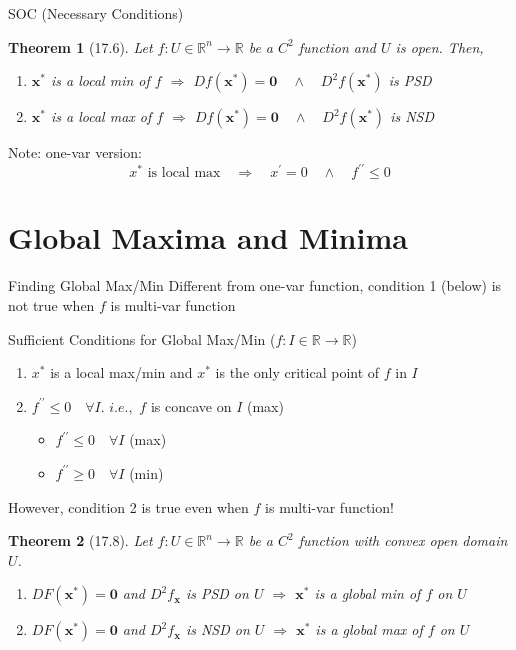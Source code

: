 \documentclass[final]{beamer}
\newtheorem{thm}{Theorem}
\newcommand{\bb}{\mathbb}
\newcommand{\bd}{\mathbf}
\begin{document}
\begin{frame}[t]{SOC (Necessary Conditions)}
	\begin{thm}
		[17.6] Let $f:U\in\bb{R}^n\rightarrow\bb{R}$ be a $C^2$ function and $U$ is open. Then,
		\begin{enumerate}
			\item $\bd{x^\ast}$ is a local min of $f$ $\Rightarrow$ $Df(\bd{x^\ast})=\bd{0}\quad\land\quad D^2f(\bd{x^\ast})$ is PSD
			\item $\bd{x^\ast}$ is a local max of $f$ $\Rightarrow$ $Df(\bd{x^\ast})=\bd{0}\quad\land\quad D^2f(\bd{x^\ast})$ is NSD
		\end{enumerate}
	\end{thm}
	Note: one-var version: \[
		x^\ast\text{ is local max} \quad\Rightarrow\quad x^\prime=0\quad\land\quad f^{\prime\prime}\le 0
	\]
\end{frame}

\section{Global Maxima and Minima} %
\label{sec:global_maxima_and_minima}
\begin{frame}[t]{Finding Global Max/Min}
	Different from one-var function, condition 1 (below) is not true when $f$ is multi-var function
	\begin{block}
		{Sufficient Conditions for Global Max/Min ($f:I\in\bb{R}\rightarrow\bb{R}$)}
		\begin{enumerate}
			\item $x^\ast$ is a local max/min and $x^\ast$ is the only critical point of $f$ in $I$
			\item $f^{\prime\prime}\le 0\quad\forall I$. $i.e.,$ $f$ is concave on $I$ (max)
			\begin{itemize}
				\item $f^{\prime\prime}\le 0 \quad \forall I$ (max)
				\item $f^{\prime\prime}\ge 0 \quad \forall I$ (min)
			\end{itemize}
		\end{enumerate}
	\end{block}
	However, condition 2 is true even when $f$ is multi-var function!
	\begin{thm}
		[17.8]
		Let $f:U\in \bb{R}^n\rightarrow \bb{R}$ be a $C^2$ function with convex open domain $U$.
		\begin{enumerate}
			\item $DF(\bd{x^\ast})=\bd{0}$ and $D^2f_{\bd{x}}$ is PSD on $U$ $\Rightarrow $ $\bd{x^\ast}$ is a global min of $f$ on $U$
			\item $DF(\bd{x^\ast})=\bd{0}$ and $D^2f_{\bd{x}}$ is NSD on $U$ $\Rightarrow $ $\bd{x^\ast}$ is a global max of $f$ on $U$
		\end{enumerate}
	\end{thm}
\end{frame}
\end{document}

